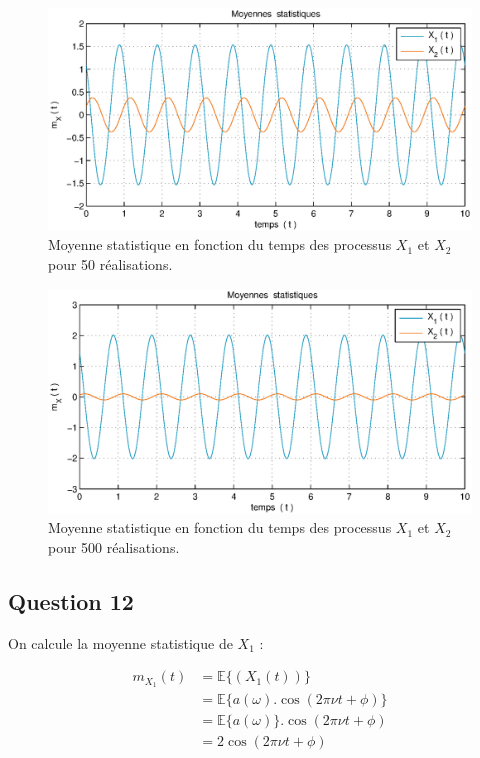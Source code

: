 \documentclass{article}
\begin{document}
\begin{figure}[p]
\hspace*{-1.6cm}
\includegraphics[width=15cm]{q11_1.eps}
\caption{Moyenne statistique en fonction du temps des processus $X_1$ et $X_2$ pour 50 réalisations.}
\label{fig:moystat50}
\end{figure}

\begin{figure}[p]
\hspace*{-1.6cm}
\includegraphics[width=15cm]{q11_2.eps}
\caption{Moyenne statistique en fonction du temps des processus $X_1$ et $X_2$ pour 500 réalisations.}
\label{fig:moystat500}
\end{figure}

\newpage
\subsection*{Question 12}
On calcule la moyenne statistique de $X_1$ :

\begin{equation}
\begin{aligned}
m_{X_1}(t)
& = \mathbb{E}\{(X_1(t))\} \\ 
& = \mathbb{E}\{a(\omega).\cos(2\pi\nu t+\phi)\} \\
& = \mathbb{E}\{a(\omega)\}.\cos(2\pi\nu t+\phi) \\
& = 2\cos(2\pi\nu t+\phi)
\end{aligned}
\end{equation}
\end{document}

